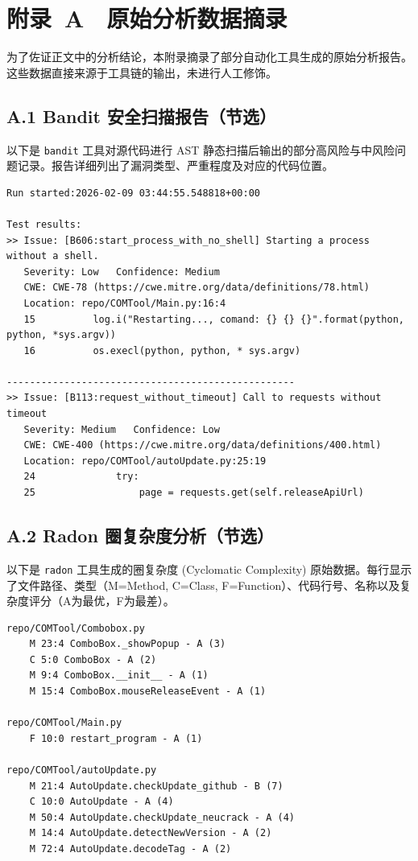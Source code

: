 \chapter*{\hfill 附录~A　原始分析数据摘录 \hfill}

为了佐证正文中的分析结论，本附录摘录了部分自动化工具生成的原始分析报告。这些数据直接来源于工具链的输出，未进行人工修饰。

\section*{A.1 Bandit 安全扫描报告（节选）}

以下是 \texttt{bandit} 工具对源代码进行 AST 静态扫描后输出的部分高风险与中风险问题记录。报告详细列出了漏洞类型、严重程度及对应的代码位置。

\begin{verbatim}
Run started:2026-02-09 03:44:55.548818+00:00

Test results:
>> Issue: [B606:start_process_with_no_shell] Starting a process without a shell.
   Severity: Low   Confidence: Medium
   CWE: CWE-78 (https://cwe.mitre.org/data/definitions/78.html)
   Location: repo/COMTool/Main.py:16:4
   15          log.i("Restarting..., comand: {} {} {}".format(python, python, *sys.argv))
   16          os.execl(python, python, * sys.argv)

--------------------------------------------------
>> Issue: [B113:request_without_timeout] Call to requests without timeout
   Severity: Medium   Confidence: Low
   CWE: CWE-400 (https://cwe.mitre.org/data/definitions/400.html)
   Location: repo/COMTool/autoUpdate.py:25:19
   24              try:
   25                  page = requests.get(self.releaseApiUrl)
\end{verbatim}

\section*{A.2 Radon 圈复杂度分析（节选）}

以下是 \texttt{radon} 工具生成的圈复杂度 (Cyclomatic Complexity) 原始数据。每行显示了文件路径、类型（M=Method, C=Class, F=Function）、代码行号、名称以及复杂度评分（A为最优，F为最差）。

\begin{verbatim}
repo/COMTool/Combobox.py
    M 23:4 ComboBox._showPopup - A (3)
    C 5:0 ComboBox - A (2)
    M 9:4 ComboBox.__init__ - A (1)
    M 15:4 ComboBox.mouseReleaseEvent - A (1)

repo/COMTool/Main.py
    F 10:0 restart_program - A (1)

repo/COMTool/autoUpdate.py
    M 21:4 AutoUpdate.checkUpdate_github - B (7)
    C 10:0 AutoUpdate - A (4)
    M 50:4 AutoUpdate.checkUpdate_neucrack - A (4)
    M 14:4 AutoUpdate.detectNewVersion - A (2)
    M 72:4 AutoUpdate.decodeTag - A (2)
\end{verbatim}

